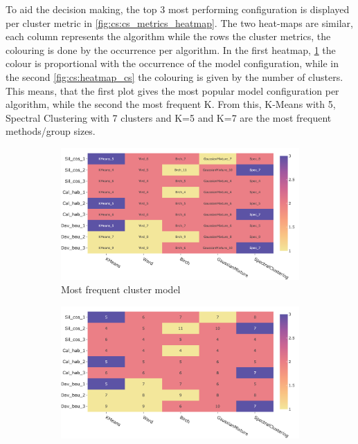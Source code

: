 To aid the decision making, the top 3 most performing configuration is displayed per cluster metric in \cref{fig:cs:cs_metrics_heatmap}. The two heat-maps are similar, each column represents the algorithm while the rows the cluster metrics, the colouring is done by the occurrence per algorithm. In the first heatmap, \cref{fig:cs:heatmap_gen} the colour is proportional with the occurrence of the model configuration, while in the second \cref{fig:cs:heatmap_cs} the colouring is given by the number of clusters. This means, that the first plot gives the most popular model configuration per algorithm, while the second the most frequent K. From this, K-Means with 5, Spectral Clustering with 7 clusters and K=5 and K=7 are the most frequent methods/group sizes. 

\begin{figure}[!htb]
    \captionsetup[subfigure]{justification=Centering}
    \centering
    \begin{subfigure}[!t]{0.65\textwidth}
        \includegraphics[width=\textwidth]{Sections/ClusteringAnalysis/Resources/cs_top3/top3_cs_gen_top3_heatmap_pca.png}
        \caption{Most frequent cluster model}
        \label{fig:cs:heatmap_gen}
    \end{subfigure}
    \centering
    \begin{subfigure}[!t]{0.65\textwidth}
        \includegraphics[width=\textwidth]{Sections/ClusteringAnalysis/Resources/cs_top3/top3_cs_size_top3_heatmap_pca.png}

\end{subfigure}
\end{figure}
